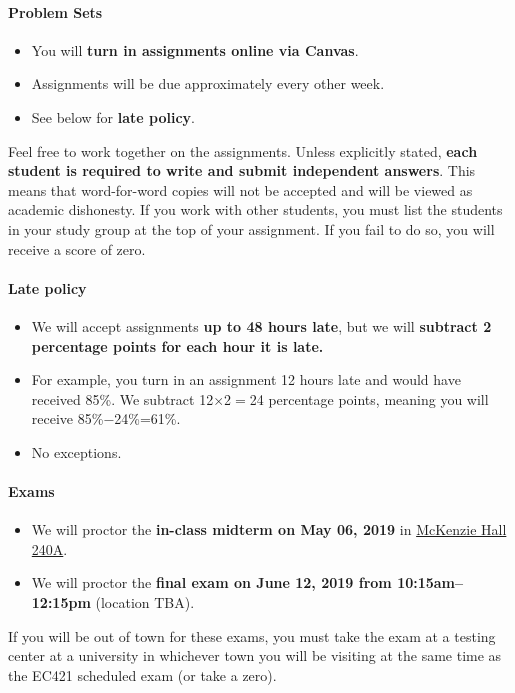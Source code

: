 \documentclass[10pt]{article}
\begin{document}
\paragraph{Problem Sets}
\begin{itemize}
  \item You will \textbf{turn in assignments online via Canvas}.
  \item Assignments will be due approximately every other week.
  \item See below for \textbf{late policy}.
\end{itemize}
Feel free to work together on the assignments. Unless explicitly stated, \textbf{each student is required to write and submit independent answers}. This means that word-for-word copies will not be accepted and will be viewed as academic dishonesty. If you work with other students, you must list the students in your study group at the top of your assignment. If you fail to do so, you will receive a score of zero.

\paragraph{Late policy}
\begin{itemize}
  \item We will accept assignments \textbf{up to 48 hours late}, but we will \textbf{subtract 2 percentage points for each hour it is late.}
  \item For example, you turn in an assignment 12 hours late and would have received 85\%. We subtract 12$\times$2$=$24 percentage points, meaning you will receive 85\%$-$24\%=61\%.
  \item No exceptions.
\end{itemize}

\paragraph{Exams}
\begin{itemize}
  \item We will proctor the \textbf{in-class midterm on May 06, 2019} in \href{https://map.uoregon.edu/c721c7d95}{McKenzie Hall 240A}.
  \item We will proctor the \textbf{final exam on June 12, 2019 from 10:15am--12:15pm} (location TBA).
\end{itemize}
If you will be out of town for these exams, you must take the exam at a testing center at a university in whichever town you will be visiting at the same time as the EC421 scheduled exam (or take a zero).
\end{document}
